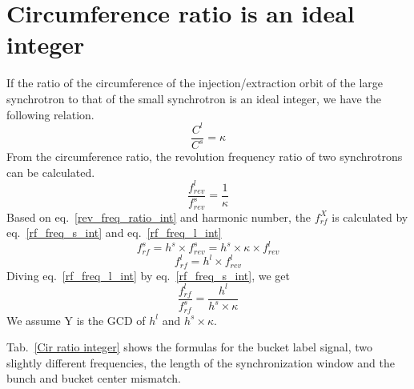 \section{ Circumference ratio is an ideal integer}

If the ratio of the circumference of the injection/extraction orbit of the large synchrotron to that of the small synchrotron is an ideal integer, we have the following relation. 
\begin{equation}
\frac{C^l}{C^s}=\kappa \label{circumference_ratio_int}
\end{equation}
From the circumference ratio, the revolution frequency ratio of two synchrotrons can be calculated.
\begin{equation}
\frac{f_{rev}^{l}}{f_{rev}^{s}}=\frac{1}{\kappa} \label{rev_freq_ratio_int}
\end{equation}
Based on eq.~\ref{rev_freq_ratio_int} and harmonic number, the $f_{rf}^{X}$ is calculated by eq.~\ref{rf_freq_s_int} and eq.~\ref{rf_freq_l_int}
\begin{equation} 
f_{rf}^{s}= h^s \times f_{rev}^{s}=h^s \times \kappa \times f_{rev}^{l} \label{rf_freq_s_int}
\end{equation}
\begin{equation} 
f_{rf}^{l}= h^l \times f_{rev}^{l} \label{rf_freq_l_int}
\end{equation}
Diving eq.~\ref{rf_freq_l_int} by eq.~\ref{rf_freq_s_int}, we get
\begin{equation} 
\frac{f_{rf}^{l}}{f_{rf}^{s}}= \frac{h^l}{h^s \times \kappa} \label{rf_freq_ratio}
\end{equation}
We assume Y is the GCD of $h^l$ and $h^s \times \kappa$.

Tab.~\ref{Cir ratio integer} shows the formulas for the bucket label signal, two slightly different frequencies, the length of the synchronization window and the bunch and bucket center mismatch.

